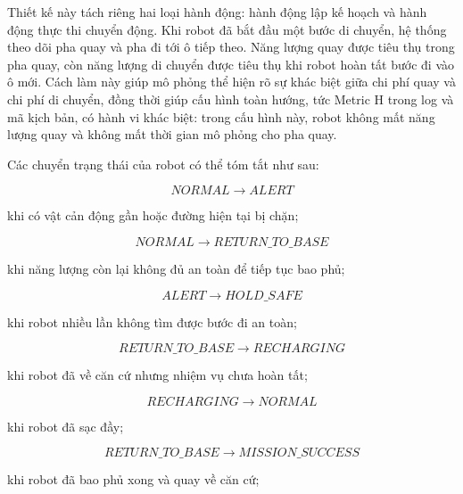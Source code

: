 \documentclass[../DoAn.tex]{subfiles}
\begin{document}
Thiết kế này tách riêng hai loại hành động: hành động lập kế hoạch và hành động thực thi chuyển động. Khi robot đã bắt đầu một bước di chuyển, hệ thống theo dõi pha quay và pha đi tới ô tiếp theo. Năng lượng quay được tiêu thụ trong pha quay, còn năng lượng di chuyển được tiêu thụ khi robot hoàn tất bước đi vào ô mới. Cách làm này giúp mô phỏng thể hiện rõ sự khác biệt giữa chi phí quay và chi phí di chuyển, đồng thời giúp cấu hình toàn hướng, tức Metric H trong log và mã kịch bản, có hành vi khác biệt: trong cấu hình này, robot không mất năng lượng quay và không mất thời gian mô phỏng cho pha quay.

Các chuyển trạng thái của robot có thể tóm tắt như sau:

\begin{equation}
    NORMAL \rightarrow ALERT
    \label{eq:mode_normal_to_alert}
\end{equation}

khi có vật cản động gần hoặc đường hiện tại bị chặn;

\begin{equation}
    NORMAL \rightarrow RETURN\_TO\_BASE
    \label{eq:mode_normal_to_return}
\end{equation}

khi năng lượng còn lại không đủ an toàn để tiếp tục bao phủ;

\begin{equation}
    ALERT \rightarrow HOLD\_SAFE
    \label{eq:mode_alert_to_hold_safe}
\end{equation}

khi robot nhiều lần không tìm được bước đi an toàn;

\begin{equation}
    RETURN\_TO\_BASE \rightarrow RECHARGING
    \label{eq:mode_return_to_recharging}
\end{equation}

khi robot đã về căn cứ nhưng nhiệm vụ chưa hoàn tất;

\begin{equation}
    RECHARGING \rightarrow NORMAL
    \label{eq:mode_recharging_to_normal}
\end{equation}

khi robot đã sạc đầy;

\begin{equation}
    RETURN\_TO\_BASE \rightarrow MISSION\_SUCCESS
    \label{eq:mode_return_to_success}
\end{equation}

khi robot đã bao phủ xong và quay về căn cứ;
\end{document}
